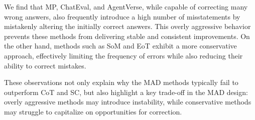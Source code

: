 We find that
MP, ChatEval, and AgentVerse, while capable of correcting many wrong answers, also frequently introduce a high number of misstatements by mistakenly altering the initially correct answers. This overly aggressive behavior prevents these methods from delivering stable and consistent improvements. On the other hand, methods such as SoM and EoT exhibit a more conservative approach, effectively limiting the frequency of errors while also reducing their ability to correct mistakes.

These observations not only explain why the MAD methods typically fail to outperform CoT and SC, but also highlight a key trade-off in the MAD design: overly aggressive methods may introduce instability, while conservative methods may struggle to capitalize on opportunities for correction. 




